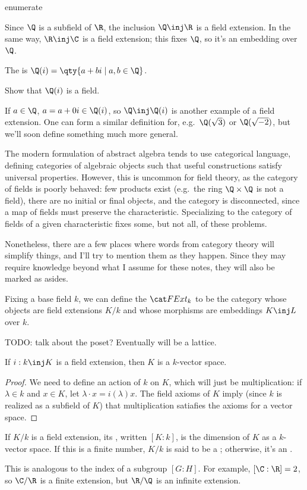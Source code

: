 \begin{comp}{ex}{enumerate}
\label{fieldextex}
	\item Since $\Q$ is a subfield of $\R$, the inclusion $\Q\inj\R$ is a field extension. In the same way,
	$\R\inj\C$ is a field extension; this fixes $\Q$, so it's an embedding over $\Q$.
	\item\label{Gaussrat} The  is $\Q(i) = \qty{a+bi\mid a,b\in\Q}$.
	\begin{ex}
	Show that $\Q(i)$ is a field.
	\end{ex}
	If $a\in\Q$, $a = a+0i\in\Q(i)$, so $\Q\inj\Q(i)$ is another example of a field extension. One can form a
	similar definition for, e.g.\ $\Q(\sqrt 3)$ or $\Q(\sqrt{-2})$, but we'll soon define something much more
	general.
\end{comp}
\begin{aside}
The modern formulation of abstract algebra tends to use categorical language, defining categories of algebraic
objects such that useful constructions satisfy universal properties. However, this is uncommon for field
theory, as the category of fields is poorly behaved: few products exist (e.g.\ the ring $\Q\times\Q$ is not a
field), there are no initial or final objects, and the category is disconnected, since a map of fields must
preserve the characteristic. Specializing to the category of fields of a given characteristic fixes some, but not
all, of these problems.

Nonetheless, there are a few places where words from category theory will simplify things, and I'll try to mention
them as they happen. Since they may require knowledge beyond what I assume for these notes, they will also be
marked as asides.

Fixing a base field $k$, we can define the  $\FExt_k$ to be the category whose
objects are field extensions $K/k$ and whose morphisms are embeddings $K\inj L$ over $k$.

{\color{red}TODO}: talk about the poset? Eventually will be a lattice.
\end{aside}
\begin{lem}
If $i:k\inj K$ is a field extension, then $K$ is a $k$-vector space.
\end{lem}
\begin{proof}
We need to define an action of $k$ on $K$, which will just be multiplication: if $\lambda\in k$ and $x\in K$, let
$\lambda\cdot x = i(\lambda)x$. The field axioms of $K$ imply (since $k$ is realized as a subfield of $K$) that
multiplication satiafies the axioms for a vector space.
\end{proof}
\begin{defn}
\label{finite_ext}
If $K/k$ is a field extension, its , written $[K:k]$, is the dimension of $K$ as a $k$-vector space.
If this is a finite number, $K/k$ is said to be a ; otherwise, it's an .
\end{defn}
This is analogous to the index of a subgroup $[G:H]$. For example, $[\C:\R] = 2$, so $\C/\R$ is a finite extension,
but $\R/\Q$ is an infinite extension.

